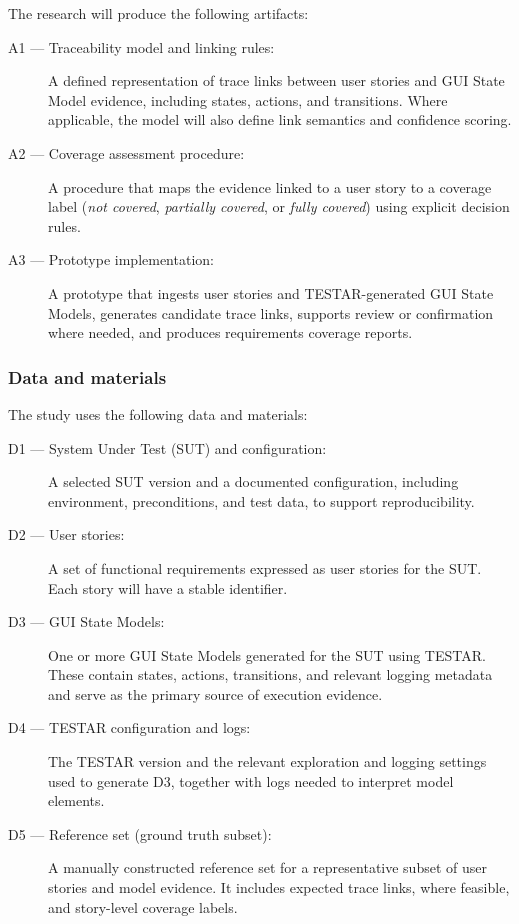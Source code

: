 The research will produce the following artifacts:

\begin{description}
    \item[A1 --- Traceability model and linking rules:]
    A defined representation of trace links between user stories and GUI State Model evidence, including states, actions, and transitions. Where applicable, the model will also define link semantics and confidence scoring.

    \item[A2 --- Coverage assessment procedure:]
    A procedure that maps the evidence linked to a user story to a coverage label
    (\emph{not covered}, \emph{partially covered}, or \emph{fully covered}) using explicit decision rules.

    \item[A3 --- Prototype implementation:]
    A prototype that ingests user stories and TESTAR-generated GUI State Models, generates candidate trace links, supports review or confirmation where needed, and produces requirements coverage reports.
\end{description}

\subsubsection{Data and materials}
\label{subsubsec:data-materials}

The study uses the following data and materials:

\begin{description}
    \item[D1 --- System Under Test (SUT) and configuration:]
    A selected SUT version and a documented configuration, including environment, preconditions, and test data, to support reproducibility.

    \item[D2 --- User stories:]
    A set of functional requirements expressed as user stories for the SUT. Each story will have a stable identifier.

    \item[D3 --- GUI State Models:]
    One or more GUI State Models generated for the SUT using TESTAR. These contain states, actions, transitions, and relevant logging metadata and serve as the primary source of execution evidence.

    \item[D4 --- TESTAR configuration and logs:]
    The TESTAR version and the relevant exploration and logging settings used to generate D3, together with logs needed to interpret model elements.

    \item[D5 --- Reference set (ground truth subset):]
    A manually constructed reference set for a representative subset of user stories and model evidence. It includes expected trace links, where feasible, and story-level coverage labels.
\end{description}

